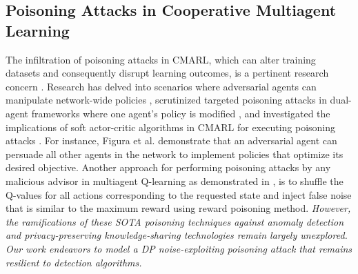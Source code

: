 \subsection{Poisoning Attacks in Cooperative Multiagent Learning} The infiltration of poisoning attacks in CMARL, which can alter training datasets and consequently disrupt learning outcomes, is a pertinent research concern \cite{figura2021adversarial,fang2020local, Xie2022,mohammadi2023implicit}. Research has delved into scenarios where adversarial agents can manipulate network-wide policies \cite{figura2021adversarial}, scrutinized targeted poisoning attacks in dual-agent frameworks where one agent’s policy is modified \cite{mohammadi2023implicit}, and investigated the implications of soft actor-critic algorithms in CMARL for executing poisoning attacks \cite{Xie2022}. For instance, Figura et al. \cite{figura2021adversarial} demonstrate that an adversarial agent can persuade all other agents in the network to implement policies that optimize its desired objective. Another approach for performing poisoning attacks by any malicious advisor in multiagent Q-learning as demonstrated in \cite{hossain2023BRNES}, is to shuffle the Q-values for all actions corresponding to the requested state
and inject false noise that is similar to the maximum reward using reward poisoning method. \textit{However, the ramifications of these SOTA poisoning techniques against anomaly detection and privacy-preserving knowledge-sharing technologies remain largely unexplored. Our work endeavors to model a DP noise-exploiting poisoning attack that remains resilient to detection algorithms.}

